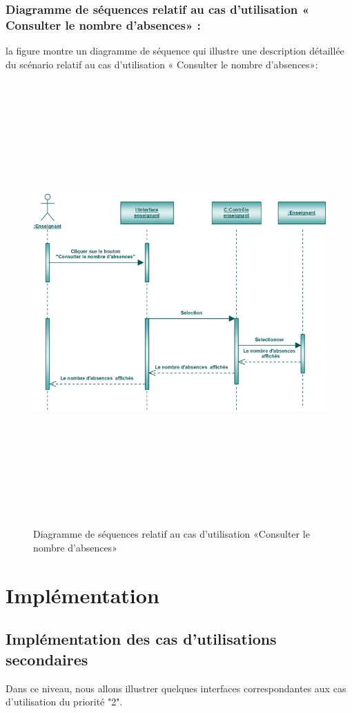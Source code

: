 \documentclass[12 pt ]{report}
\begin{document}
\subsubsection{Diagramme de séquences relatif au cas d’utilisation « Consulter le nombre d'absences» :}
la figure   montre un diagramme de séquence qui illustre une description détaillée du scénario relatif au cas d’utilisation « Consulter le nombre d'absences»: 
\begin{figure}[h]
 \begin{center}
\includegraphics[width= 18 cm ,height=  17cm]{sca.PNG}
\caption{Diagramme de séquences relatif au cas d’utilisation «Consulter le nombre d'absences»}

\end{center}
\end{figure}
\section{Implémentation}
\subsection{Implémentation des cas d'utilisations secondaires }
Dans ce niveau, nous allons illustrer quelques interfaces correspondantes aux cas d'utilisation du priorité "2".\\
\end{document}
